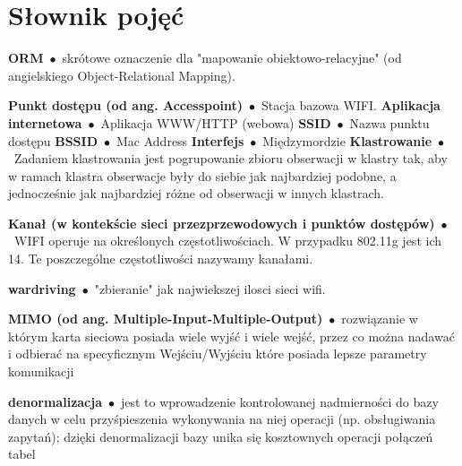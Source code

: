 \chapter*{Słownik pojęć}

\newcommand{\entry}[2]{\textbf{#1}\ $\bullet$\ {#2}}

\entry{ORM}{skrótowe oznaczenie dla "mapowanie obiektowo-relacyjne" (od angielskiego Object-Relational Mapping).}

\entry{Punkt dostępu (od ang. Accesspoint)}{Stacja bazowa WIFI.}
\entry{Aplikacja internetowa}{Aplikacja WWW/HTTP (webowa)}
\entry{SSID}{Nazwa punktu dostępu}
\entry{BSSID}{Mac Address}
\entry{Interfejs}{Międzymordzie}
\entry{Klastrowanie}{Zadaniem klastrowania jest pogrupowanie zbioru obserwacji w klastry tak, aby w ramach klastra obserwacje były do siebie jak najbardziej podobne, a jednocześnie jak najbardziej różne od obserwacji w innych klastrach.}

\entry{Kanał (w kontekście sieci przezprzewodowych i punktów dostępów)}{WIFI operuje na określonych częstotliwościach. W przypadku 802.11g jest ich 14. Te poszczególne częstotliwości nazywamy kanałami.}

\entry{wardriving}{"zbieranie" jak najwiekszej ilosci sieci wifi.}

\entry{MIMO (od ang. Multiple-Input-Multiple-Output)}{rozwiązanie w którym karta sieciowa posiada wiele wyjść i wiele wejść, przez co można nadawać i odbierać na specyficznym Wejściu/Wyjściu które posiada lepsze parametry komunikacji}

\entry{denormalizacja}{jest to wprowadzenie kontrolowanej nadmierności do bazy danych w celu przyśpieszenia wykonywania na niej operacji (np. obsługiwania zapytań); dzięki denormalizacji bazy unika się kosztownych operacji połączeń tabel}

